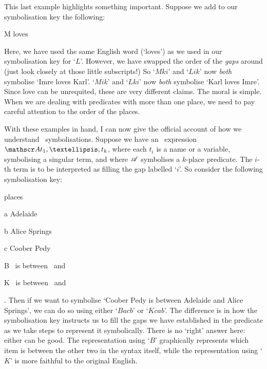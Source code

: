This last example highlights something important. Suppose we add to our symbolisation key the following:
	\begin{ekey}
		\item[M]  loves 
	\end{ekey}
Here, we have used the same English word (`loves') as we used in our symbolisation key for `$L$'. However, we have swapped the order of the \emph{gaps} around (just look closely at those little subscripts!) So `$Mki$' and `$Lik$' now \emph{both} symbolise `Imre loves Karl'. `$Mik$' and `$Lki$' now \emph{both} symbolise `Karl loves Imre'. Since love can be unrequited, these are very different claims. The moral is simple. When we are dealing with predicates with more than one place, we need to pay careful attention to the order of the places. 

With these examples in hand, I can now give the official account of how we understand \FOL\ symbolisations. Suppose we have an \FOL\ expression $\meta{A}t_{1},…,t_{k}$, where each $t_{i}$ is a name or a variable, symbolising a singular term, and where $\mathscr{A}$ symbolises a $k$-place predicate. The $i$-th term is to be interpreted as filling the gap labelled `$i$'. So consider the following symbolisation key: \begin{ekey}
	\item[\text{domain}] places
		\item[a] Adelaide
		\item[b] Alice Springs
		\item[c] Coober Pedy
		\item[B] \ is between \ and \gap{3}
		\item[K] \ is between \ and \gap{3}
\end{ekey}. Then if we want to symbolise `Coober Pedy is between Adelaide and Alice Springs', we can do so using either `$Bacb$' or `$Kcab$'. The difference is in how the symbolisation key instructs us to fill the gaps we have established in the predicate as we take steps to represent it symbolically. There is no `right' answer here: either can be good. The representation using `$B$' graphically represents which item is between the other two in the syntax itself, while the representation using `$K$' is more faithful to the original English.


